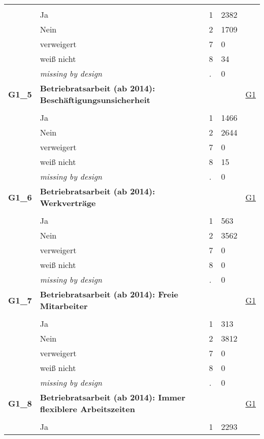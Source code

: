 \begin{longtable}{| L{2.65cm} | L{8cm} | C{1.5cm} | R{1.25cm} | C{2.25cm}  |}
   &  &  &  &  \\ 
   & Ja & 1 & 2382 &  \\ 
   & Nein & 2 & 1709 &  \\ 
   & verweigert & 7 & 0 &  \\ 
   & weiß nicht & 8 & 34 &  \\ 
   & \textit{missing by design} & \textit{.} & 0 &  \\ 
   \midrule
\textbf{G1\_5}\label{var:G1:5} & \textbf{Betriebratsarbeit (ab 2014): Beschäftigungsunsicherheit} &  &  & \hyperref[G1]{G1} \\ 
   &  &  &  &  \\ 
   & Ja & 1 & 1466 &  \\ 
   & Nein & 2 & 2644 &  \\ 
   & verweigert & 7 & 0 &  \\ 
   & weiß nicht & 8 & 15 &  \\ 
   & \textit{missing by design} & \textit{.} & 0 &  \\ 
   \midrule
\textbf{G1\_6}\label{var:G1:6} & \textbf{Betriebratsarbeit (ab 2014): Werkverträge} &  &  & \hyperref[G1]{G1} \\ 
   &  &  &  &  \\ 
   & Ja & 1 & 563 &  \\ 
   & Nein & 2 & 3562 &  \\ 
   & verweigert & 7 & 0 &  \\ 
   & weiß nicht & 8 & 0 &  \\ 
   & \textit{missing by design} & \textit{.} & 0 &  \\ 
   \midrule
\textbf{G1\_7}\label{var:G1:7} & \textbf{Betriebratsarbeit (ab 2014): Freie Mitarbeiter} &  &  & \hyperref[G1]{G1} \\ 
   &  &  &  &  \\ 
   & Ja & 1 & 313 &  \\ 
   & Nein & 2 & 3812 &  \\ 
   & verweigert & 7 & 0 &  \\ 
   & weiß nicht & 8 & 0 &  \\ 
   & \textit{missing by design} & \textit{.} & 0 &  \\ 
   \midrule
\textbf{G1\_8}\label{var:G1:8} & \textbf{Betriebratsarbeit (ab 2014): Immer flexiblere Arbeitszeiten} &  &  & \hyperref[G1]{G1} \\ 
   &  &  &  &  \\ 
   & Ja & 1 & 2293 &  \\ 

\end{longtable}
